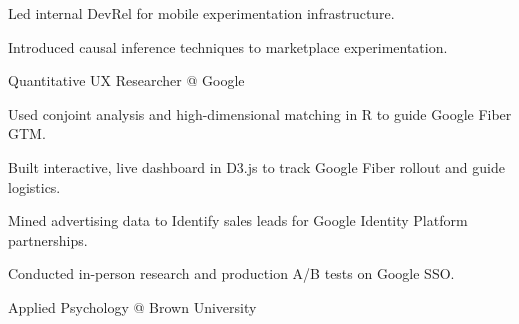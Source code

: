 \documentclass[12pt]{res}
\begin{document}
{\begin{resume}
\begin{list}{}{\leftmargin=1em}
\begin{list}{-}{\leftmargin=1em}
\item Led internal DevRel for mobile experimentation infrastructure.
\item Introduced causal inference techniques to marketplace experimentation.
\end{list}
\item \raggedright{Quantitative UX Researcher @ Google\dotfill}
\begin{list}{-}{\leftmargin=1em}
\item Used conjoint analysis and high-dimensional matching in R to guide Google Fiber GTM.
\item Built interactive, live dashboard in D3.js to track Google Fiber rollout and guide logistics.
\item Mined advertising data to Identify sales leads for Google Identity Platform partnerships.
\item Conducted in-person research and production A/B tests on Google SSO.
\end{list}
\item {}
\item \raggedright{Applied Psychology @ Brown University}\dotfill {}
\item
\end{list}
\end{resume}
} %
\end{document}
